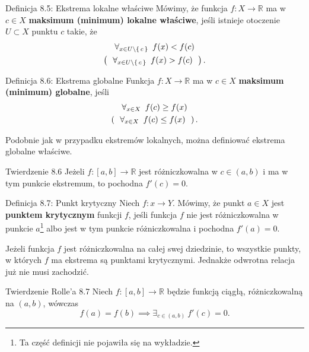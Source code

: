 \documentclass{article}
\newcommand{\hquad}{\mkern9mu}
\newcommand{\R}{\mathbb{R}}
\begin{document}
\begin{defr}{Definicja 8.5: Ekstrema lokalne właściwe}
    Mówimy, że funkcja $f:X\to\R$ ma w $c\in X$ \textbf{maksimum (minimum) lokalne właściwe}, jeśli istnieje otoczenie $U\subset X$
    punktu $c$ takie, że 
    \begin{gather*}
        \forall_{x\in U\setminus\set{c}}\hquad f(x)< f(c)\\
        \left(\ \ \forall_{x\in U\setminus\set{c}}\hquad f(x)> f(c)\ \ \right).
    \end{gather*}
\end{defr}

\begin{defr}{Definicja 8.6: Ekstrema globalne}
    Funkcja $f:X\to\R$ ma w $c\in X$ \textbf{maksimum (minimum) globalne}, jeśli
    \begin{gather*}
        \forall_{x\in X}\hquad f(c)\ge f(x)\\
        \left(\ \ \forall_{x\in X}\hquad f(c)\le f(x)\ \ \right).
    \end{gather*}
\end{defr}

Podobnie jak w przypadku ekstremów lokalnych, można definiować ekstrema globalne właściwe.

\begin{twier}{Twierdzenie 8.6}
    Jeżeli $f:[a,b]\to\R$ jest różniczkowalna w $c\in(a,b)$ i ma w tym punkcie ekstremum, to pochodna $f'(c)=0$.
\end{twier}

\begin{defr}{Definicja 8.7: Punkt krytyczny}
    Niech $f:x\to Y$. Mówimy, że punkt $a\in X$ jest \textbf{punktem krytycznym} funkcji $f$, jeśli funkcja $f$ nie jest różniczkowalna w punkcie $a$\footnote{Ta część definicji nie pojawiła się na wykładzie.} albo jest w tym punkcie różniczkowalna i pochodna $f'(a)=0$.
\end{defr}

Jeżeli funkcja $f$ jest różniczkowalna na całej swej dziedzinie, to wszystkie punkty, w których $f$ ma ekstrema są punktami krytycznymi. Jednakże odwrotna relacja już nie musi zachodzić. 

\begin{twier}{Twierdzenie Rolle'a 8.7}
    Niech $f:[a,b]\to\R$ będzie funkcją ciągłą, różniczkowalną na $(a,b)$, wówczas
    \begin{equation*}
        f(a)=f(b)\implies\exists_{c\in(a,b)}\ f'(c)=0.
    \end{equation*}
\end{twier}
\end{document}
